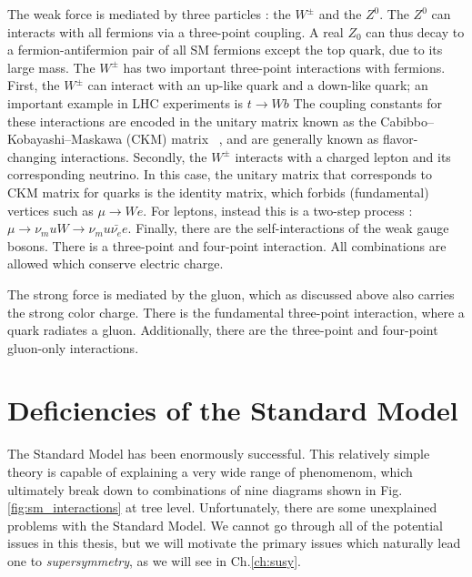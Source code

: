 The weak force is mediated by three particles : the $W^\pm$ and the $Z^0$.
The $Z^0$ can interacts with all fermions via a three-point coupling.
A real $Z_0$ can thus decay to a fermion-antifermion pair of all SM fermions except the top quark, due to its large mass.
The $W^\pm$ has two important three-point interactions with fermions.
First, the $W^\pm$ can interact with an up-like quark and a down-like quark; an important example in LHC experiments is $t \rightarrow Wb$
The coupling constants for these interactions are encoded in the unitary matrix known as the Cabibbo–Kobayashi–Maskawa (CKM) matrix ~\cite{Cabibbo:1963yz,Kobayashi:1973fv}, and are generally known as flavor-changing interactions.
Secondly, the $W^\pm$ interacts with a charged lepton and its corresponding neutrino.
In this case, the unitary matrix that corresponds to CKM matrix for quarks is the identity matrix, which forbids (fundamental) vertices such as $\mu \rightarrow We$.
For leptons, instead this is a two-step process : $\mu \rightarrow \nu_mu W \rightarrow \nu_mu \bar{\nu_e} e$.
Finally, there are the self-interactions of the weak gauge bosons.
There is a three-point and four-point interaction.
All combinations are allowed which conserve electric charge.

The strong force is mediated by the gluon, which as discussed above also carries the strong color charge.
There is the fundamental three-point interaction, where a quark radiates a gluon.
Additionally, there are the three-point and four-point gluon-only interactions.

\section{Deficiencies of the Standard Model}

The Standard Model has been enormously successful.
This relatively simple theory is capable of explaining a very wide range of phenomenom, which ultimately break down to combinations of nine diagrams shown in Fig.\ref{fig:sm_interactions} at tree level.
Unfortunately, there are some unexplained problems with the Standard Model.
We cannot go through all of the potential issues in this thesis, but we will motivate the primary issues which naturally lead one to \textit{supersymmetry}, as we will see in Ch.\ref{ch:susy}.


